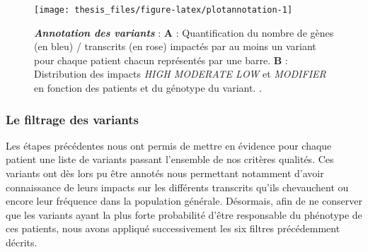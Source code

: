 \documentclass[12pt,twoside]{ugathesis}
\begin{document}
\newpage

\begin{figure}

{\centering \texttt{[image: thesis\_files/figure-latex/plotannotation-1]} 

}

\caption[Annotation des variants]{\textbf{\emph{Annotation des variants}} :
\textbf{A} : Quantification du nombre de gènes (en bleu) / transcrits
(en rose) impactés par au moins un variant pour chaque patient chacun
représentés par une barre. \textbf{B} : Distribution des impacts
\emph{HIGH MODERATE LOW} et \emph{MODIFIER} en fonction des patients et
du génotype du variant. .}\label{fig:plotannotation}
\end{figure}








\subsubsection{Le filtrage des
variants}\label{le-filtrage-des-variants-1}

Les étapes précédentes nous ont permis de mettre en évidence pour chaque
patient une liste de variants passant l'ensemble de nos critères
qualités. Ces variants ont dès lors pu être annotés nous permettant
notamment d'avoir connaissance de leurs impacts sur les différents
transcrits qu'ils chevauchent ou encore leur fréquence dans la
population générale. Désormais, afin de ne conserver que les variants
ayant la plus forte probabilité d'être responsable du phénotype de ces
patients, nous avons appliqué successivement les six filtres
précédemment décrits.
\end{document}
